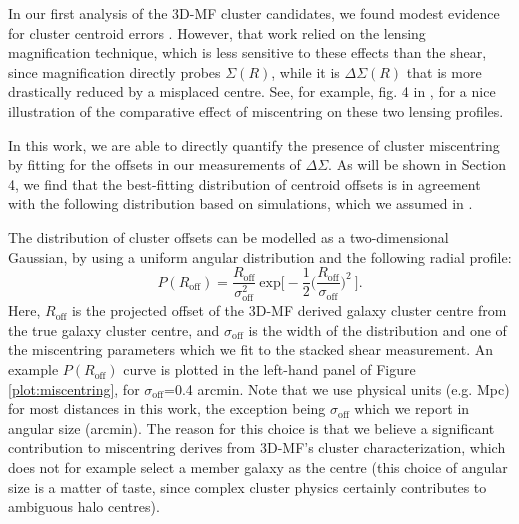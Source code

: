 In our first analysis of the \ac{3D-MF} cluster candidates, we found modest evidence for cluster centroid errors \citep{Ford14}. However, that work relied on the lensing magnification technique, which is less sensitive to these effects than the shear, since magnification directly probes $\Sigma(R)$, while it is $\Delta\Sigma(R)$ that is more drastically reduced by a misplaced centre. See, for example, fig. 4 in \citet{Johnston07}, for a nice illustration of the comparative effect of miscentring on these two lensing profiles. 

In this work, we are able to directly quantify the presence of cluster miscentring by fitting for the offsets in our measurements of $\Delta\Sigma$. As will be shown in Section 4, we find that the best-fitting distribution of centroid offsets is in agreement with the following distribution based on simulations, which we assumed in \citet{Ford14}. 

The distribution of cluster offsets can be modelled as a two-dimensional Gaussian, by using a uniform angular distribution and the following radial profile:
\begin{equation}
P(R_{\mathrm{off}})=\frac{R_{\mathrm{off}}}{\sigma_{\mathrm{off}}^2}\ \mathrm{exp}\bigg[-\frac{1}{2}\bigg(\frac{R_{\mathrm{off}}}{\sigma_{\mathrm{off}}}\bigg)^2\ \bigg].
\end{equation}
Here, $R_{\mathrm{off}}$ is the projected offset of the \ac{3D-MF} derived galaxy cluster centre from the true galaxy cluster centre, and $\sigma_{\mathrm{off}}$ is the width of the distribution and one of the miscentring parameters which we fit to the stacked shear measurement. An example $P(R_{\mathrm{off}})$ curve is plotted in the left-hand panel of Figure \ref{plot:miscentring}, for $\sigma_{\mathrm{off}}$=0.4 arcmin. Note that we use physical units (e.g. Mpc) for most distances in this work, the exception being $\sigma_{\mathrm{off}}$ which we report in angular size (arcmin). The reason for this choice is that we believe a significant contribution to miscentring derives from \ac{3D-MF}'s cluster characterization, which does not for example select a member galaxy as the centre (this choice of angular size is a matter of taste, since complex cluster physics certainly contributes to ambiguous halo centres). 

